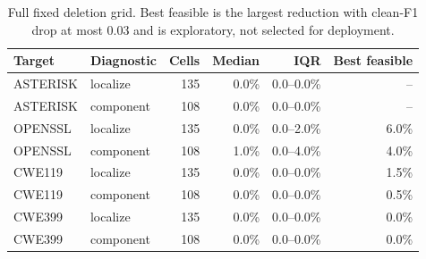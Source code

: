 \begin{table}[t]
\centering
\caption{Full fixed deletion grid. Best feasible is the largest reduction with clean-F1 drop at most 0.03 and is exploratory, not selected for deployment.}
\label{tab:deletion-sensitivity}
\scriptsize
\begin{tabular}{llrrrr}
\toprule
Target & Diagnostic & Cells & Median & IQR & Best feasible \\ 
\midrule
ASTERISK & localize & 135 & 0.0\% & 0.0--0.0\% & -- \\
ASTERISK & component & 108 & 0.0\% & 0.0--0.0\% & -- \\
OPENSSL & localize & 135 & 0.0\% & 0.0--2.0\% & 6.0\% \\
OPENSSL & component & 108 & 1.0\% & 0.0--4.0\% & 4.0\% \\
CWE119 & localize & 135 & 0.0\% & 0.0--0.0\% & 1.5\% \\
CWE119 & component & 108 & 0.0\% & 0.0--0.0\% & 0.5\% \\
CWE399 & localize & 135 & 0.0\% & 0.0--0.0\% & 0.0\% \\
CWE399 & component & 108 & 0.0\% & 0.0--0.0\% & 0.0\% \\
\bottomrule
\end{tabular}
\end{table}
